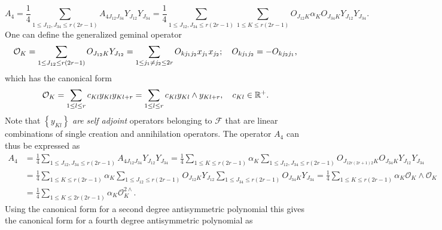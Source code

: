 \documentclass[aps, preprint]{revtex4}
\begin{document}
\begin{equation*}A_{4} =\frac{1}{4} \sum _{1 \leq J_{1 2} ,J_{3 4} \leq r \left (2 r -1\right )}A_{4 J_{1 2} J_{3 4}} Y_{J_{1 2}} Y_{J_{3 4}} =\frac{1}{4} \sum _{1 \leq J_{1 2} ,J_{3 4} \leq r \left (2 r -1\right )}\sum _{1 \leq K \leq r \left (2 r -1\right )}O_{J_{1 2} K} \alpha _{K} O_{J_{3 4} K} Y_{J_{1 2}} Y_{J_{3 4}}\text{.}
\end{equation*}One can define the generalized geminal operator
\begin{equation*}\mathcal{O}_{K} =\sum _{1 \leq J_{1 2} \leq r \left (2 r -1\right )}O_{J_{1 2} K} Y_{J_{1 2}} =\sum _{1 \leq j_{1} \neq j_{2} \leq 2 r}O_{k j_{1} j_{2}} x_{j_{1}} x_{j_{2}} ;\text{\quad }O_{k j_{1} j_{2}} = -O_{k j_{2} j_{1}}\text{,}
\end{equation*}which has the canonical form
\begin{equation*}\mathcal{O}_{K} =\sum _{1 \leq l \leq r}c_{K l} y_{K l} y_{K l +r} =\sum _{1 \leq l \leq r}c_{K l} y_{K l} \wedge y_{K l +r} ,\text{\quad }c_{K l} \in \mathbb{R}^{ +}\text{.}
\end{equation*}Note that $\left \{y_{K l}\right \}$ \emph{are} \emph{self adjoint }operators belonging to $\mathcal{F}$ that are linear combinations of single creation and annihilation operators$\text{.}$ The operator $A_{4}$ can thus be expressed as
\begin{align*}A_{4} &  =\frac{1}{4} \sum _{1 \leq J_{1 2} ,J_{3 4} \leq r \left (2 r -1\right )}A_{4 J_{1 2} J_{3 4}} Y_{J_{1 2}} Y_{J_{3 4}} =\frac{1}{4} \sum _{1 \leq K \leq r \left (2 r -1\right )}\alpha _{K} \sum _{1 \leq J_{1 2} ,J_{3 4} \leq r \left (2 r -1\right )}O_{J_{12 r \left (2 r +1\right ) 2} K} O_{J_{3 4} K} Y_{J_{1 2}} Y_{J_{3 4}} \\
 &  =\frac{1}{4} \sum _{1 \leq K \leq r \left (2 r -1\right )}\alpha _{K} \sum _{1 \leq J_{1 2} \leq r \left (2 r -1\right )}O_{J_{1 2} K} Y_{J_{1 2}} \sum _{1 \leq J_{3 4} \leq r \left (2 r -1\right )}O_{J_{3 4} K} Y_{J_{3 4}} =\frac{1}{4} \sum _{1 \leq K \leq r \left (2 r -1\right )}\alpha _{K} \mathcal{O}_{K} \wedge \mathcal{O}_{K} \\
 &  =\frac{1}{4} \sum _{1 \leq K \leq 2 r \left (2 r -1\right )}\alpha _{K} \mathcal{O}_{K}^{2 \wedge }\text{.}\end{align*}Using the canonical form for a second degree antisymmetric polynomial this gives the canonical form for a fourth degree
antisymmetric polynomial as
\end{document}
